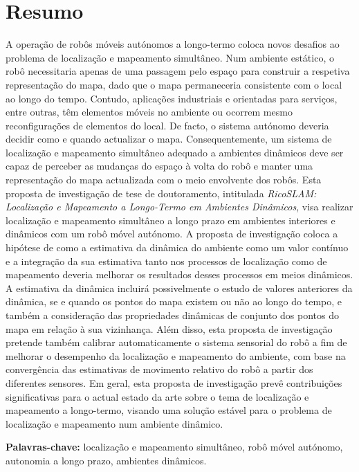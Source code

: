 \chapter*{Resumo}

A operação de robôs móveis autónomos a longo-termo coloca novos desafios ao problema de localização e mapeamento simultâneo.
Num ambiente estático, o robô necessitaria apenas de uma passagem pelo espaço para construir a respetiva representação do mapa, dado que o mapa permaneceria consistente com o local ao longo do tempo. Contudo, aplicações industriais e orientadas para serviços, entre outras, têm elementos móveis no ambiente ou ocorrem mesmo reconfigurações de elementos do local. De facto, o sistema autónomo deveria decidir como e quando actualizar o mapa.
Consequentemente, um sistema de localização e mapeamento simultâneo adequado a ambientes dinâmicos deve ser capaz de perceber as mudanças do espaço à volta do robô e manter uma representação do mapa actualizada com o meio envolvente dos robôs.
Esta proposta de investigação de tese de doutoramento, intitulada \textit{RicoSLAM: Localização e Mapeamento a Longo-Termo em Ambientes Dinâmicos}, visa realizar localização e mapeamento simultâneo a longo prazo em ambientes interiores e dinâmicos com um robô móvel autónomo.
A proposta de investigação coloca a hipótese de como a estimativa da dinâmica do ambiente como um valor contínuo e a integração da sua estimativa tanto nos processos de localização como de mapeamento deveria melhorar os resultados desses processos em meios dinâmicos.
A estimativa da dinâmica incluirá possivelmente o estudo de valores anteriores da dinâmica, se e quando os pontos do mapa existem ou não ao longo do tempo, e também a consideração das propriedades dinâmicas de conjunto dos pontos do mapa em relação à sua vizinhança.
Além disso, esta proposta de investigação pretende também calibrar automaticamente o sistema sensorial do robô a fim de melhorar o desempenho da localização e mapeamento do ambiente, com base na convergência das estimativas de movimento relativo do robô a partir dos diferentes sensores.
Em geral, esta proposta de investigação prevê contribuições significativas para o actual estado da arte sobre o tema de localização e mapeamento a longo-termo, visando uma solução estável para o problema de localização e mapeamento num ambiente dinâmico.

\hfill\break

\textbf{Palavras-chave:} localização e mapeamento simultâneo, robô móvel autónomo, autonomia a longo prazo, ambientes dinâmicos.

